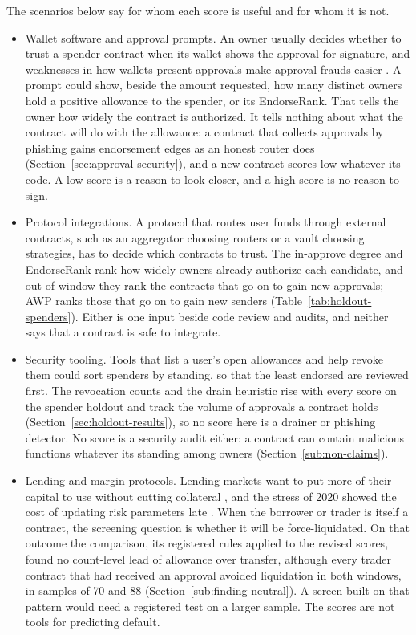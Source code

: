 
The scenarios below say for whom each score is useful and for whom it is not.

\begin{itemize}
\item Wallet software and approval prompts. An owner usually decides whether to trust a spender contract when its wallet shows the approval for signature, and weaknesses in how wallets present approvals make approval frauds easier \parencite{adamczyk2025approval}. A prompt could show, beside the amount requested, how many distinct owners hold a positive allowance to the spender, or its EndorseRank. That tells the owner how widely the contract is authorized. It tells nothing about what the contract will do with the allowance: a contract that collects approvals by phishing gains endorsement edges as an honest router does (Section~\ref{sec:approval-security}), and a new contract scores low whatever its code. A low score is a reason to look closer, and a high score is no reason to sign.
\item Protocol integrations. A protocol that routes user funds through external contracts, such as an aggregator choosing routers or a vault choosing strategies, has to decide which contracts to trust. The in-approve degree and EndorseRank rank how widely owners already authorize each candidate, and out of window they rank the contracts that go on to gain new approvals; AWP ranks those that go on to gain new senders (Table~\ref{tab:holdout-spenders}). Either is one input beside code review and audits, and neither says that a contract is safe to integrate.
\item Security tooling. Tools that list a user's open allowances and help revoke them could sort spenders by standing, so that the least endorsed are reviewed first. The revocation counts and the drain heuristic rise with every score on the spender holdout and track the volume of approvals a contract holds (Section~\ref{sec:holdout-results}), so no score here is a drainer or phishing detector. No score is a security audit either: a contract can contain malicious functions whatever its standing among owners (Section~\ref{sub:non-claims}).
\item Lending and margin protocols. Lending markets want to put more of their capital to use without cutting collateral \parencite{bartoletti2021lending}, and the stress of 2020 showed the cost of updating risk parameters late \parencite{gudgeon2020crisis}. When the borrower or trader is itself a contract, the screening question is whether it will be force-liquidated. On that outcome the comparison, its registered rules applied to the revised scores, found no count-level lead of allowance over transfer, although every trader contract that had received an approval avoided liquidation in both windows, in samples of 70 and 88 (Section~\ref{sub:finding-neutral}). A screen built on that pattern would need a registered test on a larger sample. The scores are not tools for predicting default.

\end{itemize}
